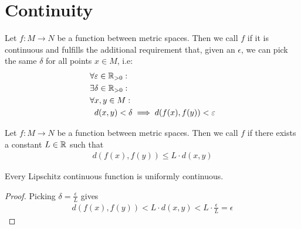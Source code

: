 \section{Continuity}
\begin{definition}
	Let $f : M \to N$ be a function between metric spaces. Then we call $f$  if it is continuous and fulfills the additional requirement that, given an $\epsilon$, we can pick the same $\delta$ for all points $x \in M$, i.e:
	\begin{align*}
		\forall &\varepsilon \in \mathbb{R}_{> 0} :\\
		\exists &\delta \in \mathbb{R}_{> 0} :\\
		\forall &x,y \in M:\\
		&d(x,y) < \delta \implies d(f(x), f(y)) < \varepsilon
	\end{align*}
\end{definition}
\begin{definition}
	Let $f : M \to N$ be a function between metric spaces. Then we call $f$  if there exists a constant $L \in \mathbb{R}$ such that
	\begin{align*}
		d(f(x), f(y)) \leq L \cdot d(x,y)
	\end{align*}
\end{definition}
\begin{theorem}
	Every Lipschitz continuous function is uniformly continuous.
\end{theorem}
\begin{proof}
	Picking $\delta = \frac{\epsilon}{L}$ gives
	\begin{align*}
		d(f(x), f(y)) < L \cdot d(x,y) < L \cdot \frac{\epsilon}{L} = \epsilon
	\end{align*}
\end{proof}

\clearpage

